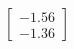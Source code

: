 \documentclass[preview]{standalone}
\begin{document}
\begin{align*}
\begin{bmatrix} -1.56 \\ -1.36 \end{bmatrix}
\end{align*}
\end{document}
